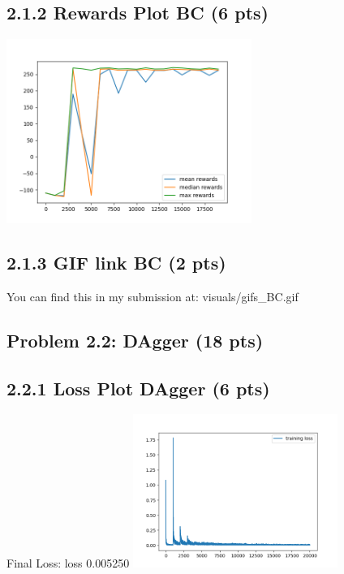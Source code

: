 \documentclass[12pt]{article}
\begin{document}
\subsection*{2.1.2 Rewards Plot BC (6 pts)}

\begin{tcolorbox}[fit,height=24em, width=40em, blank, borderline={1pt}{1pt},nobeforeafter]
     \vspace*{5em}
    \centering
    \includegraphics[width=0.6\textwidth]{visuals/BC_rewards.png}

\end{tcolorbox}
\subsection*{2.1.3 GIF link BC (2 pts)}

\begin{tcolorbox}[fit,height=5em, width=40em, blank, borderline={1pt}{1pt},nobeforeafter]
    \vspace*{1em}
    You can find this in my submission at:
    visuals/gifs\_BC.gif
\end{tcolorbox}

\subsection*{Problem 2.2: DAgger (18 pts)}

\subsection*{2.2.1 Loss Plot DAgger (6 pts)}
\begin{tcolorbox}[fit,height=20em, width=40em, blank, borderline={1pt}{1pt},nobeforeafter]
    \begin{center}
        \vspace*{2em}
        Final Loss: loss 0.005250
        \newline
        \centering
        \includegraphics[width=0.5\textwidth]{visuals/DAgger_losses.png}
    \end{center}
\end{tcolorbox}
           
\end{document}
